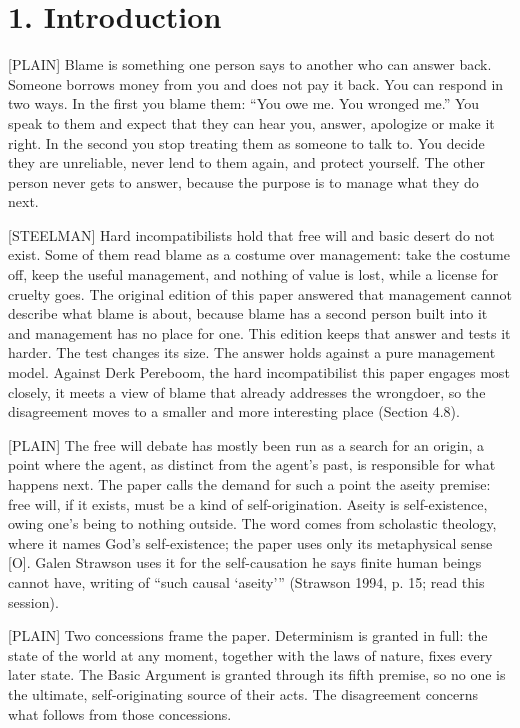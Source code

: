 \documentclass[11pt]{article}
\newcommand{\register}[1]{{\ttfamily\small #1}}
\begin{document}
\section*{1. Introduction}

\register{[PLAIN]} Blame is something one person says to another who can answer back. Someone borrows money from you and does not pay it back. You can respond in two ways. In the first you blame them: ``You owe me. You wronged me.'' You speak to them and expect that they can hear you, answer, apologize or make it right. In the second you stop treating them as someone to talk to. You decide they are unreliable, never lend to them again, and protect yourself. The other person never gets to answer, because the purpose is to manage what they do next.

\register{[STEELMAN]} Hard incompatibilists hold that free will and basic desert do not exist. Some of them read blame as a costume over management: take the costume off, keep the useful management, and nothing of value is lost, while a license for cruelty goes. The original edition of this paper answered that management cannot describe what blame is about, because blame has a second person built into it and management has no place for one. This edition keeps that answer and tests it harder. The test changes its size. The answer holds against a pure management model. Against Derk Pereboom, the hard incompatibilist this paper engages most closely, it meets a view of blame that already addresses the wrongdoer, so the disagreement moves to a smaller and more interesting place (Section 4.8).

\register{[PLAIN]} The free will debate has mostly been run as a search for an origin, a point where the agent, as distinct from the agent's past, is responsible for what happens next. The paper calls the demand for such a point the aseity premise: free will, if it exists, must be a kind of self-origination. Aseity is self-existence, owing one's being to nothing outside. The word comes from scholastic theology, where it names God's self-existence; the paper uses only its metaphysical sense [O]. Galen Strawson uses it for the self-causation he says finite human beings cannot have, writing of ``such causal `aseity'{}'' (Strawson 1994, p. 15; read this session).

\register{[PLAIN]} Two concessions frame the paper. Determinism is granted in full: the state of the world at any moment, together with the laws of nature, fixes every later state. The Basic Argument is granted through its fifth premise, so no one is the ultimate, self-originating source of their acts. The disagreement concerns what follows from those concessions.
\end{document}
